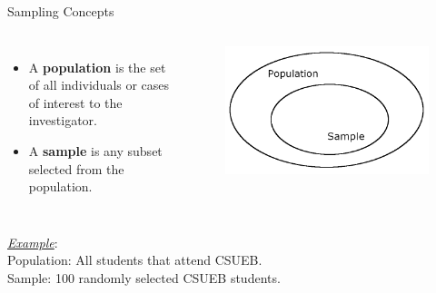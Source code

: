 \documentclass[10pt]{beamer}
\begin{document}
\begin{frame}{Sampling Concepts}
\begin{columns}
\begin{itemize}
\item A \textbf{population} is the set of all individuals or cases of interest to the investigator. 
\item A \textbf{sample} is any subset selected from the population.
\end{itemize}
\begin{figure}
\includegraphics[scale=0.75]{figure/popsamp.png}
\end{figure}
\end{columns}
\vspace{10pt}
\emph{\underline{Example}}:\\
Population: All students that attend CSUEB.\\
Sample:  100 randomly selected CSUEB students. 
\end{frame}
\end{document}
